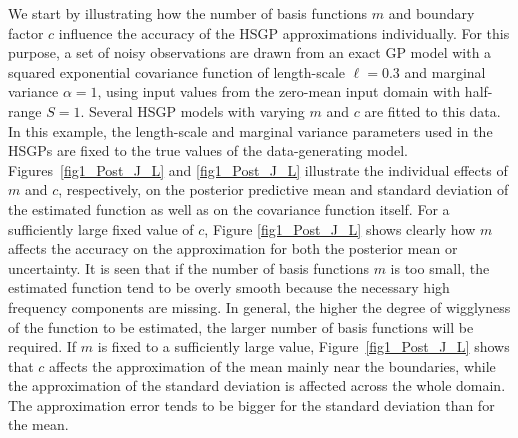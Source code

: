 We start by illustrating how the number of basis functions $m$ and boundary factor $c$ influence the accuracy of the HSGP approximations individually. For this purpose, a set of noisy observations are drawn from an exact GP model with a squared exponential covariance function of length-scale $\ell=0.3$ and marginal variance $\alpha=1$, using input values from the zero-mean input domain with half-range $S=1$. Several HSGP models with varying $m$ and $c$ are fitted to this data. In this example, the length-scale and marginal variance parameters used in the HSGPs are fixed to the true values of the data-generating model. 
Figures~\ref{fig1_Post_J_L} and \ref{fig1_Post_J_L} illustrate the individual effects of $m$ and $c$, respectively, on the posterior predictive mean and standard deviation of the estimated function as well as on the covariance function itself. For a sufficiently large fixed value of $c$, Figure \ref{fig1_Post_J_L} shows clearly how $m$ affects the accuracy on the approximation for both the posterior mean or uncertainty. It is seen that if the number of basis functions $m$ is too small, the estimated function tend to be overly smooth because the necessary high frequency components are missing. In general, the higher the degree of wigglyness of the function to be estimated, the larger number of  basis functions will be required. If $m$ is fixed to a sufficiently large value, Figure~\ref{fig1_Post_J_L} shows that $c$ affects the approximation of the mean mainly near the boundaries, while the approximation of the standard deviation is affected across the whole domain. The approximation error tends to be bigger for the standard deviation than for the mean.

